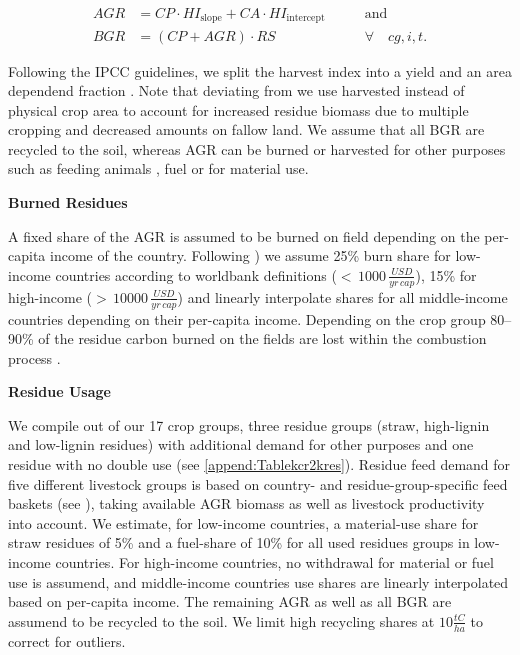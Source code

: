 \documentclass[gc, manuscript]{copernicus}
\begin{document}
\begin{equation}
\begin{aligned}
AGR & = CP \cdot HI_{\textrm{slope}} + CA \cdot HI_{\textrm{intercept}}\qquad & \textrm{and} \\
BGR & = (CP + AGR) \cdot RS \qquad                                            & \forall\quad cg, i, t.
\label{eq:resbiomass}
\end{aligned}
\end{equation}

Following the IPCC guidelines, we split the harvest index into a yield and an area dependend fraction \citep{ipcc_2006_2006}. Note that deviating from \citep{bodirsky_n2o_2012} we use harvested instead of physical crop area to account for increased residue biomass due to multiple cropping and decreased amounts on fallow land.
We assume that all BGR are recycled to the soil, whereas AGR can be burned or harvested for other purposes such as feeding animals \citep{weindl}, fuel or for material use.

\textbf{Burned Residues}

A fixed share of the AGR is assumed to be burned on field depending on the per-capita income of the country. Following \citep{smil1999}) we assume 25\% burn share for low-income countries according to worldbank definitions (\(<\,1000\,\tfrac{USD}{yr\,cap}\)), 15\% for high-income (\(>\,10000\,\tfrac{USD}{yr\,cap}\)) and linearly interpolate shares for all middle-income countries depending on their per-capita income. Depending on the crop group 80--90\% of the residue carbon burned on the fields are lost within the combustion process \citep{ipcc_2006_2006}.

\textbf{Residue Usage}

We compile out of our 17 crop groups, three residue groups (straw, high-lignin and low-lignin residues) with additional demand for other purposes and one residue with no double use (see \ref{append:Tablekcr2kres}). Residue feed demand for five different livestock groups is based on country- and residue-group-specific feed baskets (see \citep{weindl}), taking available AGR biomass as well as livestock productivity into account. We estimate, for low-income countries, a material-use share for straw residues of 5\% and a fuel-share of 10\% for all used residues groups in low-income countries. For high-income countries, no withdrawal for material or fuel use is assumend, and middle-income countries use shares are linearly interpolated based on per-capita income. The remaining AGR as well as all BGR are assumend to be recycled to the soil. We limit high recycling shares at \(10\tfrac{\unit{tC}}{\unit{ha}}\) to correct for outliers.
\end{document}
